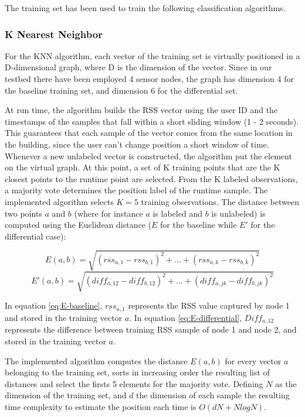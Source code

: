 The training set has been used to train the following classification algorithms.

\subsubsection{K Nearest Neighbor}
\label{subsubsec:knn}
For the KNN algorithm, each vector of the training set is virtually positioned in a D-dimensional graph, where D is the dimension of the vector. Since in our testbed there have been employed 4 sensor nodes, the graph has dimension 4 for the baseline training set, and dimension 6 for the differential set.

At run time, the algorithm builds the RSS vector using the user ID and the timestamps of the samples that fall within a short sliding window (1 - 2 seconds). This guarantees that each sample of the vector comes from the same location in the building, since the user can't change position a short window of time.
Whenever a new unlabeled vector is constructed, the algorithm put the element on the virtual graph. At this point, a set of K training points that are the K closest points to the runtime point are selected. From the K labeled observations, a majority vote determines the position label of the runtime sample. The implemented algorithm selects $K=5$ training observations.
The distance between two points $a$ and $b$ (where for instance $a$ is labeled and $b$ is unlabeled) is computed using the Euclidean distance ($E$ for the baseline while $E'$ for the differential case):

\begin{equation}\label{eq:E-baseline}
E(a,b)=\sqrt{(rss_{a,1} - rss_{b,1})^2 + ... + (rss_{a,k} - rss_{b,k})^2}
\end{equation}
\begin{equation}\label{eq:E-differential}
E'(a,b)=\sqrt{(diff_{a,12} - diff_{b,12})^2 + ... + (diff_{a,jk} - diff_{b,jk})^2}
\end{equation}

In equation \ref{eq:E-baseline}, $rss_{a,1}$ represents the RSS value captured by node 1 and stored in the training vector $a$. In equation \ref{eq:E-differential}, $Diff_{a,12}$ represents the difference between training RSS sample of node 1 and node 2, and stored in the training vector $a$.

\medskip
The implemented algorithm computes the distance $E(a,b)$ for every vector $a$ belonging to the training set, sorts in increasing order the resulting list of distances and select the firsts 5 elements for the majority vote. Defining $N$ as the dimension of the training set, and $d$ the dimension of each sample the resulting time complexity to estimate the position each time is $O(dN + NlogN)$.

